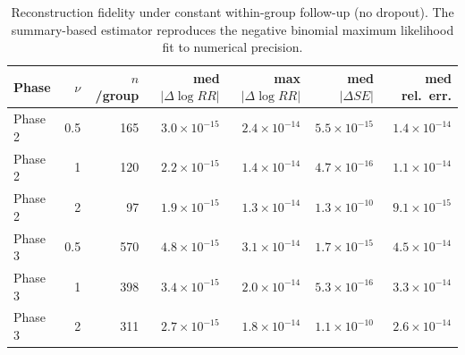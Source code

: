 \documentclass{article}
\begin{document}
\begin{table}[htbp]
\centering
\caption{Reconstruction fidelity under constant within-group follow-up (no dropout). The summary-based estimator reproduces the negative binomial maximum likelihood fit to numerical precision.}
\label{tab:recon-fidelity}
\begin{tabular}{lrrrrrr}
\toprule
Phase & $\nu$ & $n$/group & med $|\Delta \log RR|$ & max $|\Delta \log RR|$ & med $|\Delta SE|$ & med rel.\ err. \\
\midrule
Phase 2 & 0.5 & 165 & $3.0 \times 10^{-15}$ & $2.4 \times 10^{-14}$ & $5.5 \times 10^{-15}$ & $1.4 \times 10^{-14}$ \\
Phase 2 & 1 & 120 & $2.2 \times 10^{-15}$ & $1.4 \times 10^{-14}$ & $4.7 \times 10^{-16}$ & $1.1 \times 10^{-14}$ \\
Phase 2 & 2 & 97 & $1.9 \times 10^{-15}$ & $1.3 \times 10^{-14}$ & $1.3 \times 10^{-10}$ & $9.1 \times 10^{-15}$ \\
Phase 3 & 0.5 & 570 & $4.8 \times 10^{-15}$ & $3.1 \times 10^{-14}$ & $1.7 \times 10^{-15}$ & $4.5 \times 10^{-14}$ \\
Phase 3 & 1 & 398 & $3.4 \times 10^{-15}$ & $2.0 \times 10^{-14}$ & $5.3 \times 10^{-16}$ & $3.3 \times 10^{-14}$ \\
Phase 3 & 2 & 311 & $2.7 \times 10^{-15}$ & $1.8 \times 10^{-14}$ & $1.1 \times 10^{-10}$ & $2.6 \times 10^{-14}$ \\
\bottomrule
\end{tabular}
\end{table}
\end{document}

